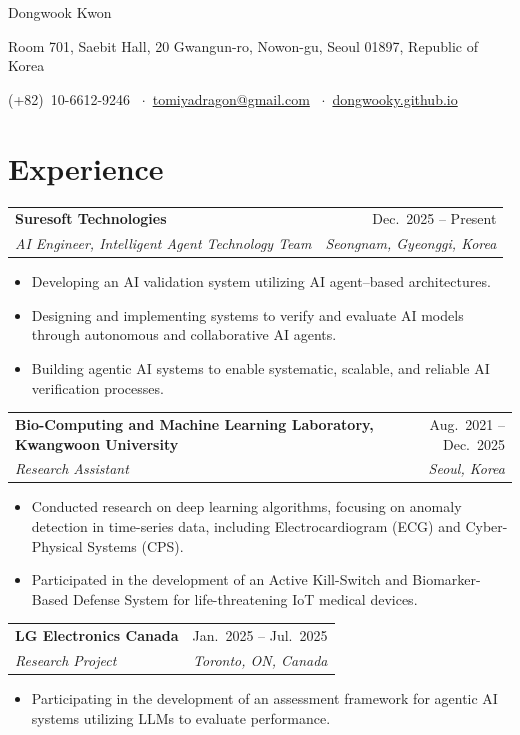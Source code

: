 \documentclass[11pt,letterpaper]{article}
\makeatletter
\newcommand{\entry}[4]{%
  \vspace{0.35em}\par
  \noindent\begin{tabularx}{\linewidth}{@{}X r@{}}
    \textbf{#1} & #2 \\[0.05em]
    \textit{#3} & \textit{#4}
  \end{tabularx}\par\vspace{0.1em}
}
\makeatother
\begin{document}
\begin{center}
  {\fontsize{22pt}{26pt}\selectfont Dongwook Kwon}\par
  \vspace{0.3em}
  {\color{muted}\small Room 701, Saebit Hall, 20 Gwangun-ro, Nowon-gu, Seoul 01897, Republic of Korea}\par
  \vspace{0.2em}
  {\small (+82)~10-6612-9246 \ {$\cdot$}\ \href{mailto:tomiyadragon@gmail.com}{tomiyadragon@gmail.com} \ {$\cdot$}\ \href{https://dongwooky.github.io}{dongwooky.github.io}}
\end{center}

\vspace{0.4em}

\section{Experience}

\entry{Suresoft Technologies}{Dec.\ 2025 -- Present}{AI Engineer, Intelligent Agent Technology Team}{Seongnam, Gyeonggi, Korea}
\begin{itemize}
  \item Developing an AI validation system utilizing AI agent--based architectures.
  \item Designing and implementing systems to verify and evaluate AI models through autonomous and collaborative AI agents.
  \item Building agentic AI systems to enable systematic, scalable, and reliable AI verification processes.
\end{itemize}

\entry{Bio-Computing and Machine Learning Laboratory, Kwangwoon University}{Aug.\ 2021 -- Dec.\ 2025}{Research Assistant}{Seoul, Korea}
\begin{itemize}
  \item Conducted research on deep learning algorithms, focusing on anomaly detection in time-series data, including Electrocardiogram (ECG) and Cyber-Physical Systems (CPS).
  \item Participated in the development of an Active Kill-Switch and Biomarker-Based Defense System for life-threatening IoT medical devices.
\end{itemize}

\entry{LG Electronics Canada}{Jan.\ 2025 -- Jul.\ 2025}{Research Project}{Toronto, ON, Canada}
\begin{itemize}
  \item Participating in the development of an assessment framework for agentic AI systems utilizing LLMs to evaluate performance.
\end{itemize}
\end{document}
